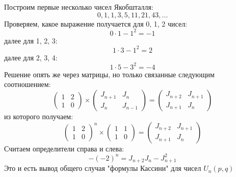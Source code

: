 \documentclass[a4paper,12pt]{article}
\begin{document}
\begin{Solution}
Построим первые несколько чисел Якобшталля:
\[
	0, 1, 1, 3, 5, 11, 21, 43, ...
\]
Проверяем, какое выражение получается для 0, 1, 2 чисел:
\[
	0 \cdot 1 - 1^2 = -1
\]
далее для 1, 2, 3:
\[
	1 \cdot 3 - 1^2 = 2
\]
далее для 2, 3, 4:
\[
	1 \cdot 5 - 3^2 = -4
\]
Решение опять же через матрицы, но только связанные следующим соотношением:
\[
	\begin{pmatrix}
		1 & 2 \\
		1 & 0
	\end{pmatrix}
	\times
	\begin{pmatrix}
		J_{n+1} & J_n \\
		J_n & J_{n-1}
	\end{pmatrix}
	=
	\begin{pmatrix}
		J_{n+2} & J_{n+1} \\
		J_{n+1} & J_n
	\end{pmatrix}
\]
из которого получаем:
\[
	\begin{pmatrix}
		1 & 2 \\
		1 & 0
	\end{pmatrix}^n
	\times
	\begin{pmatrix}
		1 & 1 \\
		1 & 0
	\end{pmatrix}
	=
	\begin{pmatrix}
		J_{n+2} & J_{n+1} \\
		J_{n+1} & J_{n}
	\end{pmatrix}
\]
Считаем определители справа и слева:
\[
	- \left(-2\right)^n = J_{n+2} J_n - J_{n+1}^2
\]
Это и есть вывод общего случая "формулы Кассини" для чисел $U_n\left(p,q\right)$
\end{Solution}
\end{document}
